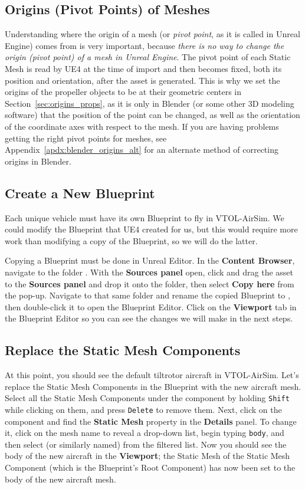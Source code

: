 \subsection{Origins (Pivot Points) of Meshes}
Understanding where the origin of a mesh (or \textit{pivot point}, as it is called in Unreal Engine) comes from is very important, because \textit{there is no way to change the origin (pivot point) of a mesh in Unreal Engine}. The pivot point of each Static Mesh is read by UE4 at the time of import and then becomes fixed, both its position and orientation, after the asset is generated. This is why we set the origins of the propeller objects to be at their geometric centers in Section~\ref{sec:origins_props}, as it is only in Blender (or some other 3D modeling software) that the position of the point can be changed, as well as the orientation of the coordinate axes with respect to the mesh. If you are having problems getting the right pivot points for meshes, see Appendix~\ref{apdx:blender_origins_alt} for an alternate method of correcting origins in Blender.

\subsection{Create a New Blueprint}
Each unique vehicle must have its own Blueprint to fly in VTOL-AirSim. We could modify the  Blueprint that UE4 created for us, but this would require more work than modifying a copy of the  Blueprint, so we will do the latter.

Copying a Blueprint must be done in Unreal Editor. In the \textbf{Content Browser}, navigate to the folder . With the \textbf{Sources panel} open, click and drag the  asset to the \textbf{Sources panel} and drop it onto the  folder, then select \textbf{Copy here} from the pop-up. Navigate to that same folder and rename the copied Blueprint to , then double-click it to open the Blueprint Editor. Click on the \textbf{Viewport} tab in the Blueprint Editor so you can see the changes we will make in the next steps.

\subsection{Replace the Static Mesh Components}
At this point, you should see the default tiltrotor aircraft in VTOL-AirSim. Let's replace the Static Mesh Components in the Blueprint with the new aircraft mesh. Select all the Static Mesh Components under the  component by holding \texttt{Shift} while clicking on them, and press \texttt{Delete} to remove them. Next, click on the  component and find the \textbf{Static Mesh} property in the \textbf{Details} panel. To change it, click on the mesh name to reveal a drop-down list, begin typing \texttt{body}, and then select  (or similarly named) from the filtered list. Now you should see the body of the new aircraft in the \textbf{Viewport}; the Static Mesh of the  Static Mesh Component (which is the Blueprint's Root Component) has now been set to the body of the new aircraft mesh.

